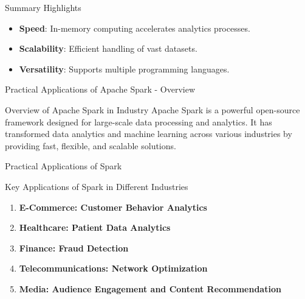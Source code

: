 \documentclass[aspectratio=169]{beamer}
\begin{document}
\begin{frame}{Summary Highlights}
  \begin{itemize}
    \item \textbf{Speed}: In-memory computing accelerates analytics processes.
    \item \textbf{Scalability}: Efficient handling of vast datasets.
    \item \textbf{Versatility}: Supports multiple programming languages.
  \end{itemize}
\end{frame}

\begin{frame}[fragile]{Practical Applications of Apache Spark - Overview}
    \begin{block}{Overview of Apache Spark in Industry}
        Apache Spark is a powerful open-source framework designed for large-scale data processing and analytics. 
        It has transformed data analytics and machine learning across various industries by providing fast, flexible, and scalable solutions.
    \end{block}
\end{frame}

\begin{frame}{Practical Applications of Spark}
    \begin{block}{Key Applications of Spark in Different Industries}
        \begin{enumerate}
            \item \textbf{E-Commerce: Customer Behavior Analytics}
            \item \textbf{Healthcare: Patient Data Analytics}
            \item \textbf{Finance: Fraud Detection}
            \item \textbf{Telecommunications: Network Optimization}
            \item \textbf{Media: Audience Engagement and Content Recommendation}
        \end{enumerate}
    \end{block}
\end{frame}
\end{document}
